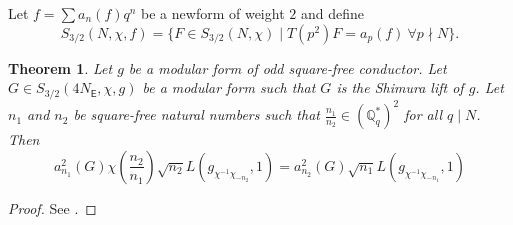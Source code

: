 \documentclass{amsart}
\newcommand{\DK}[1]{\textcolor{purple}{#1}}
\newtheorem{theorem}{Theorem}[section]
\newtheorem{lemma}[theorem]{Lemma}
\numberwithin{equation}{section}
\theoremstyle{remark}
\newcommand{\Q}{\mathbb{Q}}
\newcommand{\EC}{\mathsf{E}}
\theoremstyle{plain} %
\begin{document}

Let $f = \sum a_n(f)q^n$ be a newform of weight $2$ and define
\[
S_{3/2}(N,\chi, f)=\{ F\in S_{3/2}(N,\chi)\mid T(p^2)F=a_p(f) \ \forall p\nmid N\}.
\]

\begin{theorem}
Let $g$ be a modular form of odd square-free conductor.
Let $G\in S_{3/2}(4N_{\EC},\chi,g)$ be a modular form such that $G$ is the Shimura lift of $g$. 
Let $n_1$ and $n_2$ be square-free natural numbers such that $\frac{n_1}{n_2}\in (\Q_q^*)^{2}$ for all $q\mid N$.
Then 
\[
a_{n_1}^2(G) \chi\left(\frac{n_2}{n_1}\right) \sqrt{n_2}  L(g_{\chi^{-1}\chi_{-n_2}},1)=a_{n_2}^2(G)\sqrt{n_1}L(g_{\chi^{-1}\chi_{-n_1}},1)
\]
\end{theorem}

\begin{proof}
See \cite[Corollary~2]{waldspurger}.
\end{proof}
\end{document}
